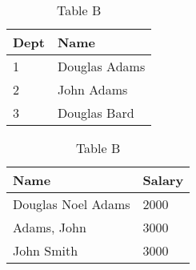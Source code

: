 \begin{table}[!htb]
    \caption{Example of a merge problem}
    \begin{subtable}{.5\linewidth}
      \centering
        \caption{Table A}
        \begin{tabular}{|l|l|}
          \hline
           Dept & Name \\
           \hline
           1    & Douglas Adams \\
           2    & John Adams \\
           3  & Douglas Bard \\
           \hline
        \end{tabular}
    \end{subtable}%
    \begin{subtable}{.5\linewidth}
      \centering
        \caption{Table B}
        \begin{tabular}{|l|l|}
          \hline
           Name & Salary \\
           \hline
           Douglas Noel Adams & 2000 \\
           Adams, John & 3000 \\
           John Smith & 3000 \\
           \hline
        \end{tabular}
    \end{subtable}
    \label{table-example}
\end{table}


